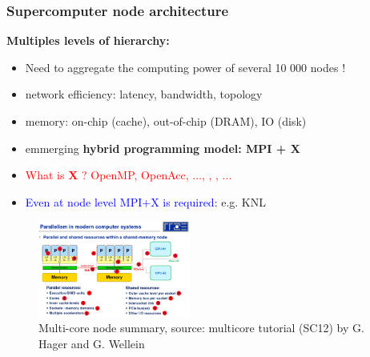 \begin{frame}

\end{frame}

\begin{frame}
  \frametitle{Supercomputer node architecture}

  \begin{center}
    \textbf{Multiples levels of hierarchy:}
    \begin{itemize}
    \item Need to aggregate the computing power of several 10 000 nodes !
    \item network efficiency: latency, bandwidth, topology
    \item memory: on-chip (cache), out-of-chip (DRAM), IO (disk)
    \item emmerging \textbf{hybrid programming model: MPI + X}
    \item \textcolor{red}{What is \textbf{X} ? OpenMP, OpenAcc, ..., , , ...}
    \item \textcolor{blue}{Even at node level MPI+X is required:} e.g. KNL
    \end{itemize}
  \end{center}

  \begin{figure}
    \includegraphics[width=5cm]{images/multicore_hardware}
    \caption{\scriptsize{Multi-core node summary,
        source: multicore tutorial (SC12) by G. Hager and G. Wellein}}
  \end{figure}
  
\end{frame}


